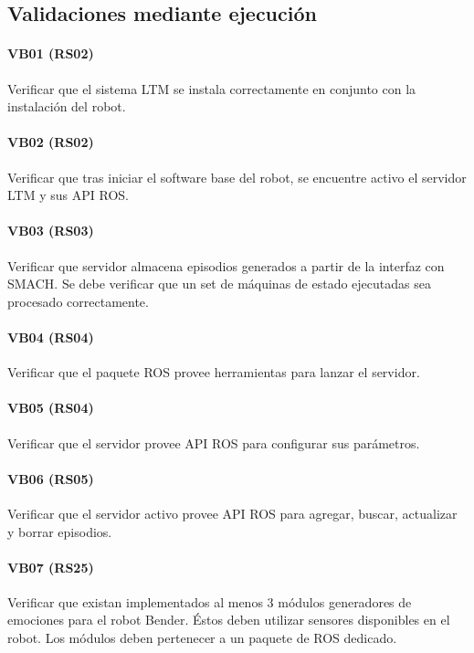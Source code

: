 \subsection{Validaciones mediante ejecución}

\paragraph{VB01 (RS02)}
Verificar que el sistema LTM se instala correctamente en conjunto con la instalación del robot.

\paragraph{VB02 (RS02)}
Verificar que tras iniciar el software base del robot, se encuentre activo el servidor LTM y sus API ROS.

\paragraph{VB03 (RS03)}
Verificar que servidor almacena episodios generados a partir de la interfaz con SMACH. Se debe verificar que un set de máquinas de estado ejecutadas sea procesado correctamente.

\paragraph{VB04 (RS04)}
Verificar que el paquete ROS provee herramientas para lanzar el servidor.

\paragraph{VB05 (RS04)}
Verificar que el servidor provee API ROS para configurar sus parámetros.

\paragraph{VB06 (RS05)}
Verificar que el servidor activo provee API ROS para agregar, buscar, actualizar y borrar episodios. 

\paragraph{VB07 (RS25)}
Verificar que existan implementados al menos 3 módulos generadores de emociones para el robot Bender. Éstos deben utilizar sensores disponibles en el robot. Los módulos deben pertenecer a un paquete de ROS dedicado.


